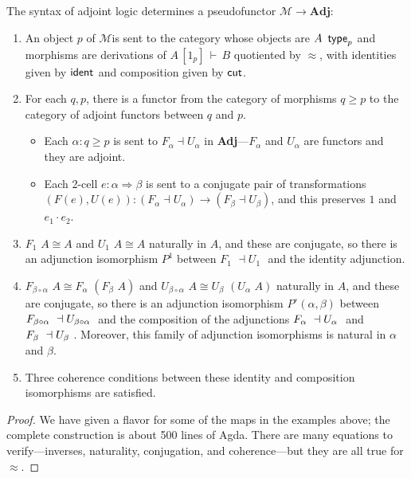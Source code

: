 \documentclass{drl-common/llncs}
\newcommand{\M}{\ensuremath{\mathcal{M}}}
\newcommand{\la}{\ensuremath{\dashv}}
\newcommand{\tc}[2]{\ensuremath{#1 \Rightarrow #2}}
\newcommand{\Adj}{\textbf{Adj}}
\newcommand\compo[2]{\ensuremath{#1 \circ #2}}
\newcommand\compv[2]{\ensuremath{#1 \cdot #2}}
\renewcommand\wftp[2]{\ensuremath{#1 \,\,\, \dsd{type}_{#2}}}
\newcommand\F[2]{\ensuremath{F_{#1} \,\, #2}}
\newcommand\U[2]{\ensuremath{U_{#1} \,\, #2}}
\newcommand\seq[3]{\ensuremath{#1 \, [ #2 ] \, \vdash \, #3}}
\newcommand\ident[1]{\ensuremath{\dsd{ident}_{#1}}}
\newcommand\cutsym{\ensuremath{\dsd{cut}}}
\newcommand\ap[2]{\ensuremath{#1 \approx #2}}
\newcommand\iso{\cong}
\begin{document}
\begin{theorem} \label{thm:syntacticpseudofunctor}
The syntax of adjoint logic determines a pseudofunctor $\M \to \Adj$:
\begin{enumerate}
\item An object $p$ of \M is sent to the category whose objects are
  \wftp{A}{p} and morphisms are derivations of
  \seq{A}{1_p}{B} quotiented by $\ap{}{}$, with identities given by
  \ident{} and composition given by \cutsym.

\item For each $q,p$, there is a functor from the category of morphisms
  $q \ge p$ to the category of adjoint functors between $q$ and $p$.
  \begin{itemize}
  \item 
  Each $\alpha : q \ge p$ is sent to $F_\alpha \la U_\alpha$ in
  \Adj---$F_\alpha$ and $U_\alpha$ are functors and they are adjoint.

  \item Each 2-cell $e : \tc{\alpha}{\beta}$ is sent to a conjugate pair of transformations
     $(F(e),U(e)) : (F_\alpha \la U_\alpha) \to (F_\beta \la
    U_\beta)$, and this preserves $1$ and $\compv{e_1}{e_2}$.
  \end{itemize}

\item $\F 1 A \iso A$ and $\U 1 A \iso A$ naturally in $A$, and these
  are conjugate, so there is an adjunction isomorphism $P^1$ between $\F 1 {}
  \la \U 1 {}$ and the identity adjunction.

\item $\F {\compo{\beta}{\alpha}} A \iso \F \alpha {(\F \beta A)}$ and
  $\U {\compo{\beta}{\alpha}} A \iso \U \beta {(\U \alpha A)}$ naturally
  in $A$, and these are conjugate, so there is an adjunction isomorphism
  $P^{\circ}(\alpha,\beta)$ between $\F {\compo{\beta}{\alpha}} \la \U
  {\compo{\beta}{\alpha}}$ and the composition of the adjunctions $\F
  {\alpha} \la \U {\alpha}$ and $\F {\beta} \la \U {\beta}$.  Moreover,
  this family of adjunction isomorphisms is natural in $\alpha$ and
  $\beta$.

\item Three coherence conditions between these identity and composition
  isomorphisms are satisfied.
\end{enumerate}
\end{theorem}

\begin{proof}
We have given a flavor for some of the maps in the examples above; the
complete construction is about 500 lines of Agda.  There are many
equations to verify---inverses, naturality, conjugation, and
coherence---but they are all true for \ap{}{}.
\end{proof}
\end{document}
